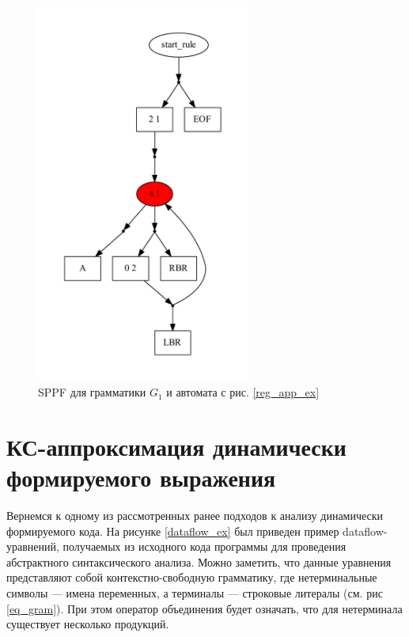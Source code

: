 \documentclass[14pt]{matmex-diploma-custom}
\begin{document}
\begin{figure}[t!]
\centering
\includegraphics[width=7cm]{pictures/sppf.pdf}
\caption{SPPF для грамматики $G_1$ и автомата с рис. \ref{reg_app_ex}}
\label{sppf_1}
\end{figure}

\section{КС-аппроксимация динамически формируемого выражения}
Вернемся к одному из рассмотренных ранее подходов к анализу динамически формируемого кода. На рисунке \ref{dataflow_ex} был приведен пример dataflow-уравнений, получаемых из исходного кода программы для проведения абстрактного синтаксического анализа. Можно заметить, что данные уравнения представляют собой контекстно-свободную грамматику, где нетерминальные символы --- имена переменных, а терминалы --- строковые литералы (см. рис \ref{eq_gram}). При этом оператор объединения будет означать, что для нетерминала существует несколько продукций.
\end{document}
